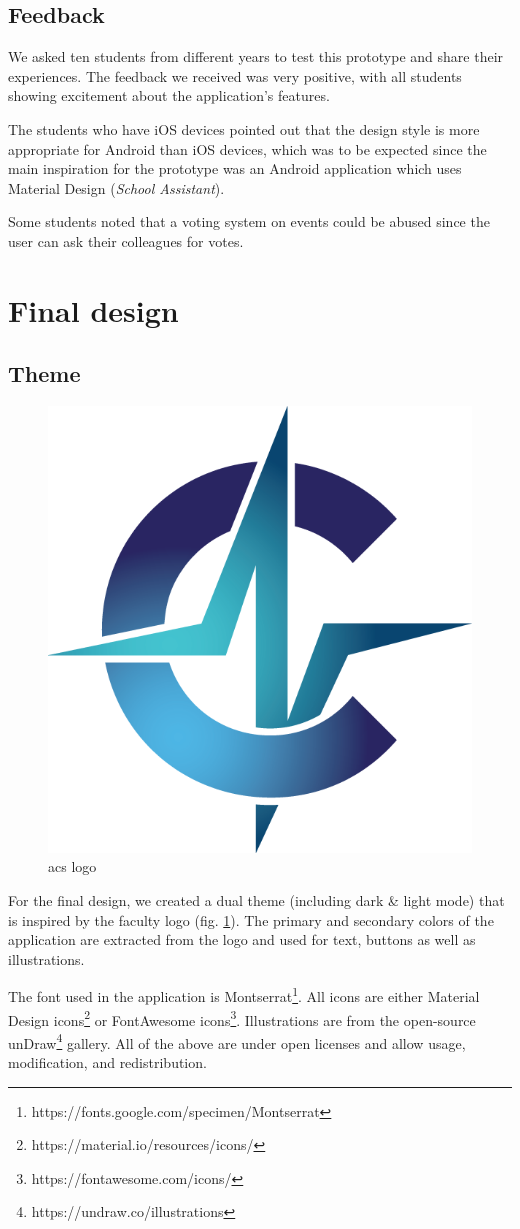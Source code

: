 \subsection{Feedback} \label{4:wireframe_feedback}

We asked ten students from different years to test this prototype and share their experiences. The feedback we received was very positive, with all students showing excitement about the application's features.

The students who have iOS devices pointed out that the design style is more appropriate for Android than iOS devices, which was to be expected since the main inspiration for the prototype was an Android application which uses Material Design\cite{google2020material} (\textit{School Assistant}).

Some students noted that a voting system on events could be abused since the user can ask their colleagues for votes.

\section{Final design} \label{4:final}

\subsection{Theme} \label{4:final_theme}

\begin{figure}
    \centering
    \captionsetup{justification=centering}
    \includegraphics[width=0.14\columnwidth]{figures/logos/acs.png}
    \caption{\acrshort{acs} logo}
    \label{4:fig:acs_logo}
\end{figure}

For the final design, we created a dual theme (including dark \& light mode) that is inspired by the faculty logo (fig. \ref{4:fig:acs_logo}). The primary and secondary colors of the application are extracted from the logo and used for text, buttons as well as illustrations.

The font used in the application is Montserrat\footnote{https://fonts.google.com/specimen/Montserrat}. All icons are either Material Design icons\footnote{https://material.io/resources/icons/} or FontAwesome icons\footnote{https://fontawesome.com/icons/}. Illustrations are from the open-source unDraw\footnote{https://undraw.co/illustrations} gallery. All of the above are under open licenses and allow usage, modification, and redistribution.

